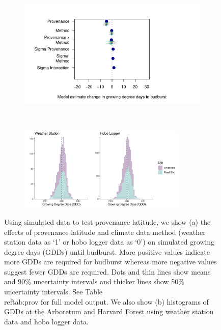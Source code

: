 \documentclass{article}\usepackage[]{graphicx}\usepackage[]{color}
\begin{document}
  
\begin{figure}[H]
    \begin{subfigure}{.5\linewidth}
      \caption{}
      \centering
      \includegraphics[height=7cm, width=11cm]{..//analyses/figures/muplot_prov.pdf}
      \label{fig:muplotprov}
    \end{subfigure}
  \begin{subfigure}{.5\linewidth}
	    \caption{}
      \centering
      \includegraphics[height=4cm, width=8cm]{..//analyses/figures/gdd_methods_prov.pdf}
    \label{fig:gddprov}
  \end{subfigure}
\caption{ Using simulated data to test provenance latitude, we show (a) the effects of provenance latitude and climate data method (weather station data as `1' or hobo logger data as `0') on simulated growing degree days (GDDs) until budburst. More positive values indicate more GDDs are required for budburst whereas more negative values suggest fewer GDDs are required. Dots and thin lines show means and 90\% uncertainty intervals and thicker lines show 50\% uncertainty intervals. See Table \\ref{tab:prov} for full model output. We also show (b) histograms of GDDs at the Arboretum and Harvard Forest using weather station data and hobo logger data. }
\label{fig:prov}
\end{figure}
\end{document}
